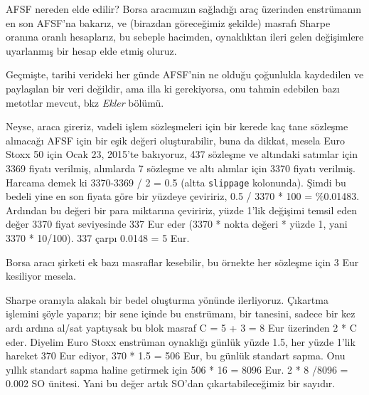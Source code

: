 \documentclass[12pt,fleqn]{article}\usepackage{../../common}
\begin{document}
AFSF nereden elde edilir?  Borsa aracımızın sağladığı araç üzerinden enstrümanın
en son AFSF'na bakarız, ve (birazdan göreceğimiz şekilde) masrafı Sharpe oranına
oranlı hesaplarız, bu sebeple hacimden, oynaklıktan ileri gelen değişimlere
uyarlanmış bir hesap elde etmiş oluruz.

Geçmişte, tarihi verideki her günde AFSF'nin ne olduğu çoğunlukla kaydedilen ve
paylaşılan bir veri değildir, ama illa ki gerekiyorsa, onu tahmin edebilen bazı
metotlar mevcut, bkz {\em Ekler} bölümü.

Neyse, araca gireriz, vadeli işlem sözleşmeleri için bir kerede kaç tane
sözleşme alınacağı AFSF için bir eşik değeri oluşturabilir, buna da dikkat,
mesela Euro Stoxx 50 için Ocak 23, 2015'te bakıyoruz, 437 sözleşme ve altındaki
satımlar için 3369 fiyatı verilmiş, alımlarda 7 sözleşme ve altı alımlar için
3370 fiyatı verilmiş. Harcama demek ki 3370-3369 / 2 = 0.5 (altta
\verb!slippage! kolonunda). Şimdi bu bedeli yine en son fiyata göre bir yüzdeye
çeviririz, 0.5 / 3370 * 100 = \%0.01483. Ardından bu değeri bir para miktarına
çeviririz, yüzde 1'lik değişimi temsil eden değer 3370 fiyat seviyesinde 337 Eur
eder (3370 * nokta değeri * yüzde 1, yani 3370 * 10/100). 337 çarpı 0.0148 = 5
Eur.

Borsa aracı şirketi ek bazı masraflar kesebilir, bu örnekte her sözleşme için 3
Eur kesiliyor mesela.

Sharpe oranıyla alakalı bir bedel oluşturma yönünde ilerliyoruz.  Çıkartma
işlemini şöyle yaparız; bir sene içinde bu enstrümanı, bir tanesini, sadece bir
kez ardı ardına al/sat yaptıysak bu blok masraf C = 5 + 3 = 8 Eur üzerinden 2 *
C eder. Diyelim Euro Stoxx enstrüman oynaklığı günlük yüzde 1.5, her yüzde 1'lik
hareket 370 Eur ediyor, 370 * 1.5 = 506 Eur, bu günlük standart sapma. Onu
yıllık standart sapma haline getirmek için 506 * 16 = 8096 Eur.  2 * 8 /8096 =
0.002 SO ünitesi. Yani bu değer artık SO'dan çıkartabileceğimiz bir sayıdır.
\end{document}

